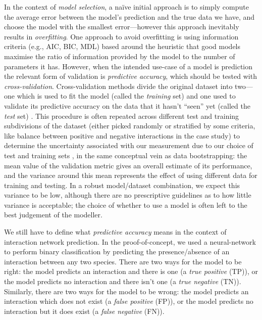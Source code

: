 In the context of \emph{model selection}, a naïve initial approach is to
simply compute the average error between the model's prediction and the
true data we have, and choose the model with the smallest
error---however this approach inevitably results in \emph{overfitting}.
One approach to avoid overfitting is using information criteria (e.g.,
AIC, BIC, MDL) based around the heuristic that good models maximise the
ratio of information provided by the model to the number of parameters
it has. However, when the intended use-case of a model is prediction the
relevant form of validation is \emph{predictive accuracy}, which should
be tested with \emph{cross-validation}. Cross-validation methods divide
the original dataset into two---one which is used to fit the model
(called the \emph{training} set) and one used to validate its predictive
accuracy on the data that it hasn't ``seen'' yet (called the \emph{test}
set) \cite{Bishop2006PatRec}. This procedure is often repeated across
different test and training subdivisions of the dataset (either picked
randomly or stratified by some criteria, like balance between positive
and negative interactions in the case study) to determine the
uncertainty associated with our measurement due to our choice of test
and training sets \cite{Arlot2010SurCro}, in the same conceptual vein as
data bootstrapping: the mean value of the validation metric gives an
overall estimate of its performance, and the variance around this mean
represents the effect of using different data for training and testing.
In a robust model/dataset combination, we expect this variance to be
low, although there are no prescriptive guidelines as to how little
variance is acceptable; the choice of whether to use a model is often
left to the best judgement of the modeller.

We still have to define what \emph{predictive accuracy} means in the
context of interaction network prediction. In the proof-of-concept, we
used a neural-network to perform binary classification by predicting the
presence/absence of an interaction between any two species. There are
two ways for the model to be right: the model predicts an interaction
and there is one (a \emph{true positive} (TP)), or the model predicts no
interaction and there isn't one (a \emph{true negative} (TN)).
Similarly, there are two ways for the model to be wrong: the model
predicts an interaction which does not exist (a \emph{false positive}
(FP)), or the model predicts no interaction but it does exist (a
\emph{false negative} (FN)).

